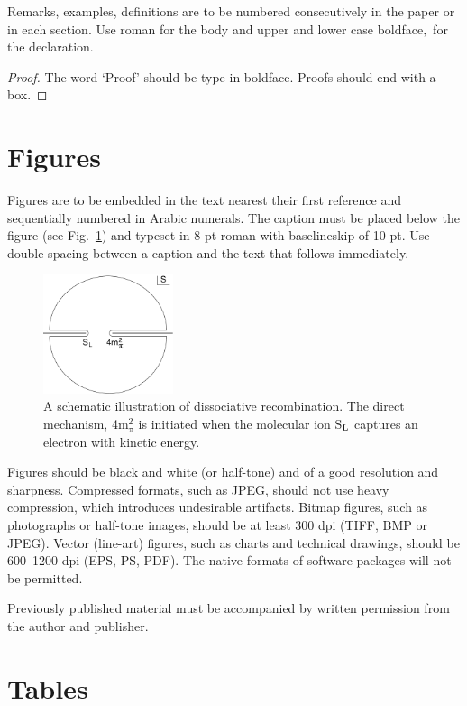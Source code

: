 \documentclass{ws-ijmpa}
\begin{document}
\begin{remark}
Remarks, examples, definitions are to be numbered
consecutively in the paper or in each section. Use roman for the
body and upper and lower case boldface$,$ for the declaration.
\end{remark}

\begin{proof}
The word `Proof' should be type in boldface. Proofs
should end with\break
a box.
\end{proof}

\section{Figures}

Figures are to be embedded in the text nearest their first reference
and sequentially numbered in Arabic numerals. The caption must be
placed below the figure (see Fig.~\ref{f1}) and typeset in 8 pt roman with
baselineskip of 10 pt. Use double spacing between a caption and the
text that follows immediately.

\begin{figure}[b]
\centerline{\includegraphics[width=3.8cm]{ijmpaf1}}
\caption{A schematic illustration of dissociative recombination. The
direct mechanism, 4m$^2_\pi$ is initiated when the
molecular ion S$_{\rm L}$ captures an electron with
kinetic energy. \label{f1}}
\end{figure}

Figures should be black and white (or half-tone) and of a good
resolution and sharpness. Compressed formats, such as JPEG, should not
use heavy compression, which introduces undesirable artifacts. Bitmap
figures, such as photographs or half-tone images, should be at least
300 dpi (TIFF, BMP or JPEG). Vector (line-art) figures, such as
charts and technical drawings, should be 600--1200 dpi (EPS, PS,
PDF). The native formats of software packages will not be permitted.

Previously published material must be accompanied by written
permission from the author and publisher.

\section{Tables}
\end{document}
